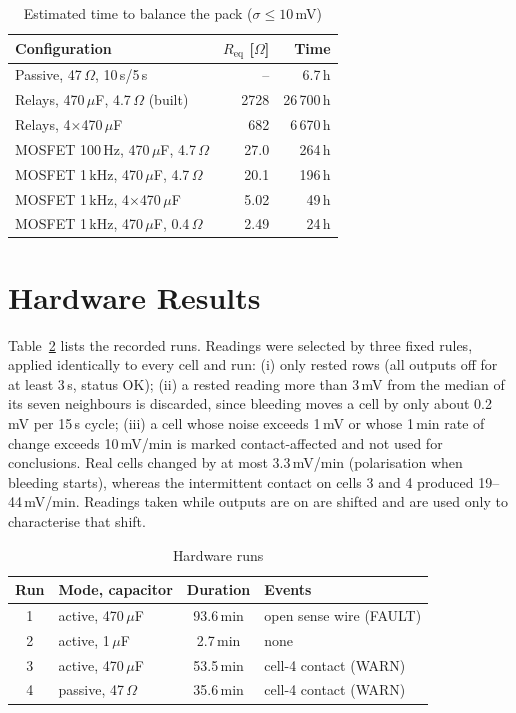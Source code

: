 \documentclass[conference]{IEEEtran}
\begin{document}
\begin{table}[t]
\caption{Estimated time to balance the pack ($\sigma\le10$\,mV)}
\label{tab:est}
\centering
\small
\begin{tabular}{@{}lrr@{}}
\toprule
Configuration & $R_\text{eq}$ [$\Omega$] & Time \\
\midrule
Passive, 47\,$\Omega$, 10\,s/5\,s & -- & 6.7\,h \\
\midrule
Relays, 470\,$\mu$F, 4.7\,$\Omega$ (built) & 2728 & 26\,700\,h \\
Relays, 4$\times$470\,$\mu$F & 682 & 6\,670\,h \\
MOSFET 100\,Hz, 470\,$\mu$F, 4.7\,$\Omega$ & 27.0 & 264\,h \\
MOSFET 1\,kHz, 470\,$\mu$F, 4.7\,$\Omega$ & 20.1 & 196\,h \\
MOSFET 1\,kHz, 4$\times$470\,$\mu$F & 5.02 & 49\,h \\
MOSFET 1\,kHz, 470\,$\mu$F, 0.4\,$\Omega$ & 2.49 & 24\,h \\
\bottomrule
\end{tabular}
\end{table}

\section{Hardware Results}
\label{sec:hw}
Table~\ref{tab:runs} lists the recorded runs. Readings were selected by three fixed rules, applied identically to
every cell and run: (i) only rested rows (all outputs off for at least 3\,s, status OK); (ii) a rested reading more
than 3\,mV from the median of its seven neighbours is discarded, since bleeding moves a cell by only about
0.2\,mV per 15\,s cycle; (iii) a cell whose noise exceeds 1\,mV or whose 1\,min rate of change exceeds
10\,mV/min is marked contact-affected and not used for conclusions. Real cells changed by at most 3.3\,mV/min
(polarisation when bleeding starts), whereas the intermittent contact on cells 3 and 4 produced 19--44\,mV/min.
Readings taken while outputs are on are shifted and are used only to characterise that shift.

\begin{table}[t]
\caption{Hardware runs}
\label{tab:runs}
\centering
\small
\begin{tabular}{@{}clcl@{}}
\toprule
Run & Mode, capacitor & Duration & Events \\
\midrule
1 & active, 470\,$\mu$F & 93.6\,min & open sense wire (FAULT) \\
2 & active, 1\,$\mu$F & 2.7\,min & none \\
3 & active, 470\,$\mu$F & 53.5\,min & cell-4 contact (WARN) \\
4 & passive, 47\,$\Omega$ & 35.6\,min & cell-4 contact (WARN) \\
\bottomrule
\end{tabular}
\end{table}
\end{document}
